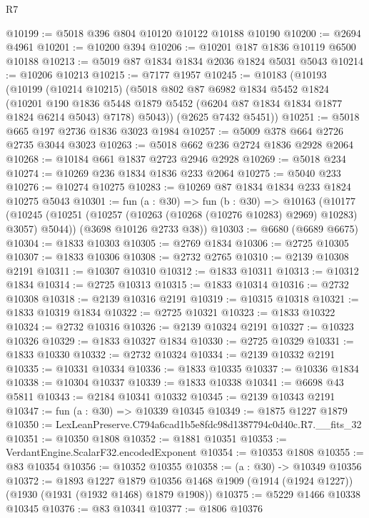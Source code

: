 \begin{lexlean}{R7}
\begin{coremodule}
@10199 := @5018 @396 @804 @10120 @10122 @10188 @10190
@10200 := @2694 @4961
@10201 := @10200 @394
@10206 := @10201 @187 @1836 @10119 @6500 @10188
@10213 := @5019 @87 @1834 @1834 @2036 @1824 @5031 @5043
@10214 := @10206 @10213
@10215 := @7177 @1957
@10245 := @10183
    (@10193
      (@10199
        (@10214 @10215)
        (@5018
          @802
          @87
          @6982
          @1834
          @5452
          @1824
          (@10201
            @190
            @1836
            @5448
            @1879
            @5452
            (@6204 @87 @1834 @1834 @1877 @1824 @6214 @5043)
            @7178)
          @5043))
      (@2625 @7432 @5451))
@10251 := @5018 @665 @197 @2736 @1836 @3023 @1984
@10257 := @5009 @378 @664 @2726 @2735 @3044 @3023
@10263 := @5018 @662 @236 @2724 @1836 @2928 @2064
@10268 := @10184 @661 @1837 @2723 @2946 @2928
@10269 := @5018 @234
@10274 := @10269 @236 @1834 @1836 @233 @2064
@10275 := @5040 @233
@10276 := @10274 @10275
@10283 := @10269 @87 @1834 @1834 @233 @1824 @10275 @5043
@10301 := fun (a : @30) =>
  fun (b : @30) =>
  @10163
    (@10177
      (@10245 (@10251 (@10257 (@10263 (@10268 (@10276 @10283) @2969) @10283) @3057) @5044))
      (@3698 @10126 @2733 @38))
@10303 := @6680 (@6689 @6675)
@10304 := @1833 @10303
@10305 := @2769 @1834
@10306 := @2725 @10305
@10307 := @1833 @10306
@10308 := @2732 @2765
@10310 := @2139 @10308 @2191
@10311 := @10307 @10310
@10312 := @1833 @10311
@10313 := @10312 @1834
@10314 := @2725 @10313
@10315 := @1833 @10314
@10316 := @2732 @10308
@10318 := @2139 @10316 @2191
@10319 := @10315 @10318
@10321 := @1833 @10319 @1834
@10322 := @2725 @10321
@10323 := @1833 @10322
@10324 := @2732 @10316
@10326 := @2139 @10324 @2191
@10327 := @10323 @10326
@10329 := @1833 @10327 @1834
@10330 := @2725 @10329
@10331 := @1833 @10330
@10332 := @2732 @10324
@10334 := @2139 @10332 @2191
@10335 := @10331 @10334
@10336 := @1833 @10335
@10337 := @10336 @1834
@10338 := @10304 @10337
@10339 := @1833 @10338
@10341 := @6698 @43 @5811
@10343 := @2184 @10341 @10332
@10345 := @2139 @10343 @2191
@10347 := fun (a : @30) => @10339 @10345
@10349 := @1875 @1227 @1879
@10350 := LexLeanPreserve.C794a6cad1b5e8fdc98d1387794c0d40c.R7.__fits_32
@10351 := @10350 @1808
@10352 := @1881 @10351
@10353 := VerdantEngine.ScalarF32.encodedExponent
@10354 := @10353 @1808
@10355 := @83 @10354
@10356 := @10352 @10355
@10358 := (a : @30) -> @10349 @10356
@10372 := @1893
    @1227
    @1879
    @10356
    @1468
    @1909
    (@1914 (@1924 @1227))
    (@1930 (@1931 (@1932 @1468) @1879 @1908))
@10375 := @5229 @1466 @10338 @10345
@10376 := @83 @10341
@10377 := @1806 @10376

\end{coremodule}
\end{lexlean}

